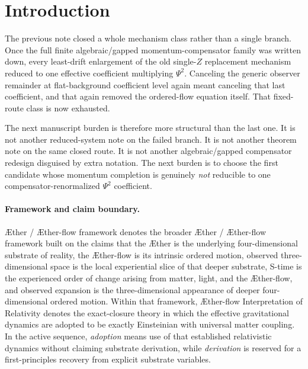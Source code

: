 \documentclass[11pt]{article}
\newcommand{\Aether}{\AE{}ther}
\newcommand{\Aflow}{\AE{}ther-flow}
\newcommand{\TheoryName}{\Aflow{} Interpretation of Relativity}
\newcommand{\TheoryProgram}{\Aether{} / \Aflow{} framework}
\begin{document}
\begin{abstract}
That is the first honest post-exhaustion verdict. The new branch is genuinely beyond the exhausted finite algebraic/gapped class because it keeps a real ordered-flow equation. But the generic observer remainder still vanishes only if \(\Lambda_{\mathrm{na}}(k^2)\equiv0\) for all \(k\), which forces \(\beta_Z=0\) and hence collapses straight back to the exhausted algebraic route. The smallest non-algebraic momentum completion is therefore architecturally honest but coefficient-level negative. The note stops there, without reopening reduced-system, local-coercive, or theorem work. At fixed bridge metric and single-metric matter route, the next admissible structural direction is now the explicit symmetry/quotient route; failing that, a later reconsideration of the bridge metric or of the matter route becomes the next larger move.
\end{abstract}

\section{Introduction}

The previous note closed a whole mechanism class rather than a single branch. Once the full finite algebraic/gapped momentum-compensator family was written down, every least-drift enlargement of the old single-\(Z\) replacement mechanism reduced to one effective coefficient multiplying \(\Psi^2\). Canceling the generic observer remainder at flat-background coefficient level again meant canceling that last coefficient, and that again removed the ordered-flow equation itself. That fixed-route class is now exhausted.

The next manuscript burden is therefore more structural than the last one. It is not another reduced-system note on the failed branch. It is not another theorem note on the same closed route. It is not another algebraic/gapped compensator redesign disguised by extra notation. The next burden is to choose the first candidate whose momentum completion is genuinely \emph{not} reducible to one compensator-renormalized \(\Psi^2\) coefficient.

\paragraph{Framework and claim boundary.}
\TheoryProgram{} denotes the broader \Aether{} / \Aflow{} framework built on the claims that the \Aether{} is the underlying four-dimensional substrate of reality, the \Aflow{} is its intrinsic ordered motion, observed three-dimensional space is the local experiential slice of that deeper substrate, S-time is the experienced order of change arising from matter, light, and the \Aflow{}, and observed expansion is the three-dimensional appearance of deeper four-dimensional ordered motion. Within that framework, \TheoryName{} denotes the exact-closure theory in which the effective gravitational dynamics are adopted to be exactly Einsteinian with universal matter coupling. In the active sequence, \emph{adoption} means use of that established relativistic dynamics without claiming substrate derivation, while \emph{derivation} is reserved for a first-principles recovery from explicit substrate variables.
\end{document}
